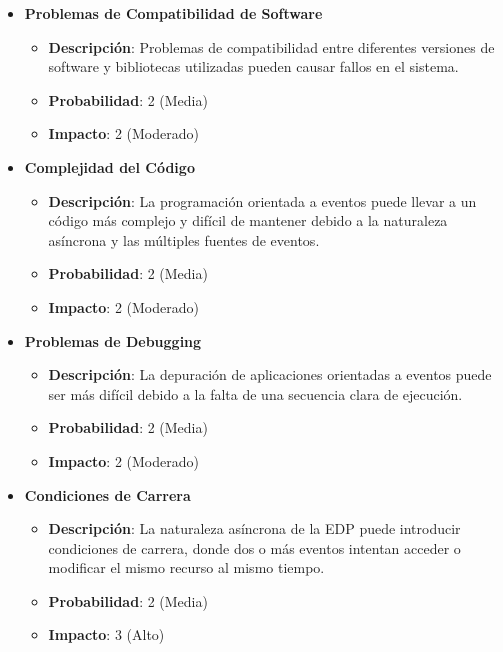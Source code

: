\documentclass{article}
\begin{document}
\begin{itemize}
    \item \textbf{Problemas de Compatibilidad de Software}
          \begin{itemize}
              \item \textbf{Descripción}: Problemas de compatibilidad entre diferentes versiones de software y bibliotecas utilizadas pueden causar fallos en el sistema.
              \item \textbf{Probabilidad}: 2 (Media)
              \item \textbf{Impacto}: 2 (Moderado)
          \end{itemize}

    \item \textbf{Complejidad del Código}
          \begin{itemize}
              \item \textbf{Descripción}: La programación orientada a eventos puede llevar a un código más complejo y difícil de mantener debido a la naturaleza asíncrona y las múltiples fuentes de eventos.
              \item \textbf{Probabilidad}: 2 (Media)
              \item \textbf{Impacto}: 2 (Moderado)
          \end{itemize}

    \item \textbf{Problemas de Debugging}
          \begin{itemize}
              \item \textbf{Descripción}: La depuración de aplicaciones orientadas a eventos puede ser más difícil debido a la falta de una secuencia clara de ejecución.
              \item \textbf{Probabilidad}: 2 (Media)
              \item \textbf{Impacto}: 2 (Moderado)
          \end{itemize}

    \item \textbf{Condiciones de Carrera}
          \begin{itemize}
              \item \textbf{Descripción}: La naturaleza asíncrona de la EDP puede introducir condiciones de carrera, donde dos o más eventos intentan acceder o modificar el mismo recurso al mismo tiempo.
              \item \textbf{Probabilidad}: 2 (Media)
              \item \textbf{Impacto}: 3 (Alto)
          \end{itemize}


\end{itemize}
\end{document}
